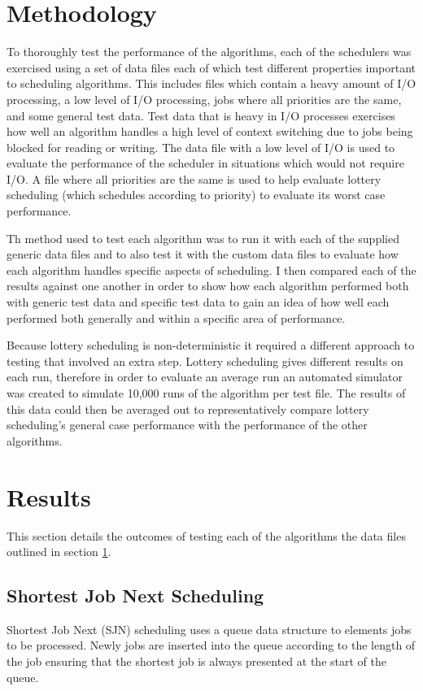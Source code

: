 \documentclass{acm_proc_article-sp}
\begin{document}
\section{Methodology} 
\label{methodology}
To thoroughly test the performance of the algorithms, each of the schedulers was exercised using a set of data files each of which test different properties important to scheduling algorithms. This includes files which contain a heavy amount of I/O processing, a low level of I/O processing, jobs where all priorities are the same, and some general test data. Test data that is heavy in I/O processes exercises how well an algorithm handles a high level of context switching due to jobs being blocked for reading or writing. The data file with a low level of I/O is used to evaluate the performance of the scheduler in situations which would not require I/O. A file where all priorities are the same is used to help evaluate lottery scheduling (which schedules according to priority) to evaluate its worst case performance.

Th method used to test each algorithm was to run it with each of the supplied generic data files and to also test it with the custom data files to evaluate how each algorithm handles specific aspects of scheduling. I then compared each of the results against one another in order to show how each algorithm performed both with generic test data and specific test data to gain an idea of how well each performed both generally and within a specific area of performance.

Because lottery scheduling is non-deterministic it required a different approach to testing that involved an extra step. Lottery scheduling gives different results on each run, therefore in order to evaluate an average run an automated simulator was created to simulate 10,000 runs of the algorithm per test file. The results of this data could then be averaged out to representatively compare lottery scheduling's general case performance with the performance of the other algorithms.

\section{Results}
This section details the outcomes of testing each of the algorithms the data files outlined in section \ref{methodology}.

\subsection{Shortest Job Next Scheduling}
Shortest Job Next (SJN) scheduling uses a queue data structure to elements jobs to be processed. Newly jobs are inserted into the queue according to the length of the job ensuring that the shortest job is always presented at the start of the queue.
\end{document}
